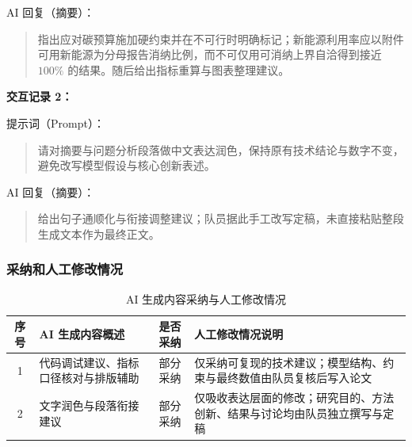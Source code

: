 \documentclass[UTF8,a4paper,zihao=-4]{ctexart}
\renewcommand{\arraystretch}{1}
\begin{document}
AI 回复（摘要）：
\begin{quote}
\small
指出应对碳预算施加硬约束并在不可行时明确标记；新能源利用率应以附件可用新能源为分母报告消纳比例，而不可仅用可消纳上界自洽得到接近 $100\%$ 的结果。随后给出指标重算与图表整理建议。
\end{quote}

\textbf{交互记录 2：}

提示词（Prompt）：
\begin{quote}
\small
请对摘要与问题分析段落做中文表达润色，保持原有技术结论与数字不变，避免改写模型假设与核心创新表述。
\end{quote}

AI 回复（摘要）：
\begin{quote}
\small
给出句子通顺化与衔接调整建议；队员据此手工改写定稿，未直接粘贴整段生成文本作为最终正文。
\end{quote}

\subsubsection{采纳和人工修改情况}

\begin{table}[H]
\centering
\small
\caption{AI 生成内容采纳与人工修改情况}
\label{tab:ai-adopt}
\renewcommand{\arraystretch}{1.15}
\begin{tabular}{clcp{6.2cm}}
\toprule
序号 & AI 生成内容概述 & 是否采纳 & 人工修改情况说明 \\
\midrule
1 & 代码调试建议、指标口径核对与排版辅助 & 部分采纳 & 仅采纳可复现的技术建议；模型结构、约束与最终数值由队员复核后写入论文 \\
2 & 文字润色与段落衔接建议 & 部分采纳 & 仅吸收表达层面的修改；研究目的、方法创新、结果与讨论均由队员独立撰写与定稿 \\
\bottomrule
\end{tabular}
\end{table}
\end{document}
